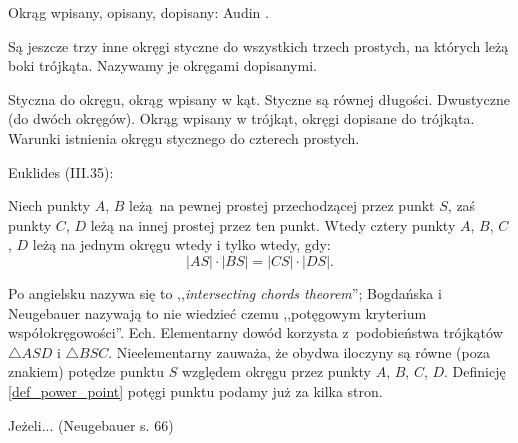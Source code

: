 
Okrąg wpisany, opisany, dopisany: Audin \cite[s. 98]{audin_2003}.
%
%
%

Są jeszcze trzy inne okręgi styczne do wszystkich trzech prostych, na których leżą boki trójkąta.
Nazywamy je okręgami dopisanymi.

Styczna do okręgu, okrąg wpisany w kąt.
Styczne są równej długości.
Dwustyczne (do dwóch okręgów).
Okrąg wpisany w trójkąt, okręgi dopisane do trójkąta.
Warunki istnienia okręgu stycznego do czterech prostych.

Euklides (III.35):

\begin{proposition}
    \label{prop_intersecting_chords}
	Niech punkty $A$, $B$ leżą na pewnej prostej przechodzącej przez punkt $S$, zaś punkty $C$, $D$ leżą na innej prostej przez ten punkt.
	Wtedy cztery punkty $A$, $B$, $C$, $D$ leżą na jednym okręgu wtedy i tylko wtedy, gdy:
	\begin{equation}
		|AS| \cdot |BS| = |CS| \cdot |DS|.
	\end{equation}
\end{proposition}

Po angielsku nazywa się to ,,\emph{intersecting chords theorem}''; Bogdańska i Neugebauer nazywają to nie wiedzieć czemu ,,potęgowym kryterium współokręgowości''.
Ech.
Elementarny dowód korzysta z~podobieństwa trójkątów $\triangle ASD$ i $\triangle BSC$.
Nieelementarny zauważa, że obydwa iloczyny są równe (poza znakiem) potędze punktu $S$ względem okręgu przez punkty $A$, $B$, $C$, $D$.
Definicję \ref{def_power_point} potęgi punktu podamy już za kilka stron.
%

\begin{proposition}
	Jeżeli... (Neugebauer s. 66)
\end{proposition}

